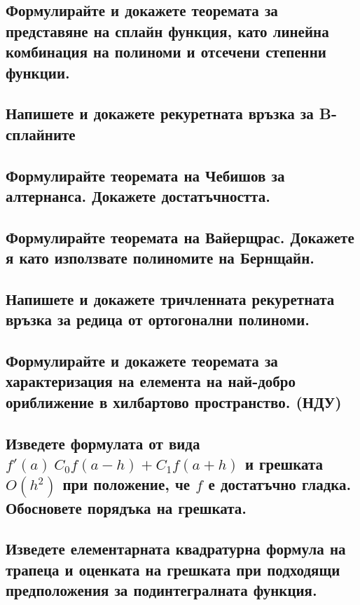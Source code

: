 \documentclass[12pt]{article}
\numberwithin{equation}{subsection}
\numberwithin{theorem}{subsection}
\numberwithin{definition}{subsection}
\numberwithin{corollary}{subsection}
\begin{document}
\subsection{Формулирайте и докажете теоремата за представяне на сплайн функция,
като линейна комбинация на полиноми и отсечени степенни функции.}

\subsection{Напишете и докажете рекуретната връзка за B-сплайните}

\subsection{Формулирайте теоремата на Чебишов за алтернанса. Докажете достатъчността.}

\subsection{Формулирайте теоремата на Вайерщрас. Докажете я като използвате полиномите на Бернщайн.}

\subsection{Напишете и докажете тричленната рекуретната връзка за редица от ортогонални полиноми.}

\subsection{Формулирайте и докажете теоремата за характеризация на елемента на най-добро ориближение в хилбартово пространство. (НДУ)}

\subsection{Изведете формулата от вида $f'(a) ~ C_0 f(a - h) + C_1 f(a + h)$ и грешката $O(h^2)$ при положение, че $f$ е достатъчно гладка.
        Обосновете порядъка на грешката.}

\subsection{Изведете елементарната квадратурна формула на трапеца и оценката на грешката при подходящи предположения за подинтегралната функция.}
\end{document}

